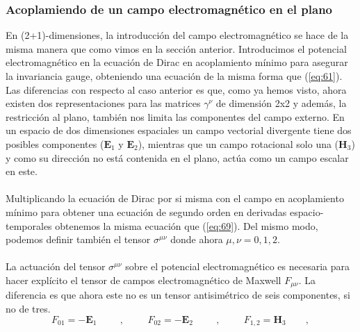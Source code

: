 \documentclass[11pt,letterpaper]{article}     %
\begin{document}
\subsubsection{Acoplamiendo de un campo electromagnético en el plano}







En (2+1)-dimensiones, la introducción del campo electromagnético se hace de la misma manera que como vimos en la sección anterior. Introducimos el potencial electromagnético en la ecuación de Dirac en acoplamiento mínimo para asegurar la invariancia gauge, obteniendo una ecuación de la misma forma que (\ref{eq:61}). Las diferencias con respecto al caso anterior es que, como ya hemos visto, ahora existen dos representaciones para las matrices $\gamma^\nu$ de dimensión 2x2 y además, la restricción al plano, también nos limita las componentes del campo externo. En un espacio de dos dimensiones espaciales un campo vectorial divergente tiene dos posibles componentes ($\textbf{E}_1$ y $\textbf{E}_2$), mientras que un campo rotacional solo una ($\textbf{H}_3$) y como su dirección no está contenida en el plano, actúa como un campo escalar en este. \\ \\
Multiplicando la ecuación de Dirac por si misma con el campo en acoplamiento mínimo para obtener una ecuación de segundo orden en derivadas espacio-temporales obtenemos la misma ecuación que (\ref{eq:69}). Del mismo modo, podemos definir también el tensor $\sigma^{\mu \nu}$ donde ahora $\mu, \nu=0,1,2$. \\ \\
La actuación del tensor $\sigma^{\mu \nu}$ sobre el potencial electromagnético es necesaria para hacer explícito el tensor de campos electromagnético de Maxwell $F_{\mu \nu}$. La diferencia es que ahora este no es un tensor antisimétrico de seis componentes, si no de tres.
\begin{equation}\label{eq:131}
F_{01}=-{\textbf{E}}_1 \hspace{1cm} , \hspace{1cm} F_{02}=- {\textbf{E}}_2 \hspace{1cm} , \hspace{1cm} F_{1,2}={\textbf{H}}_3 \qquad ,
\end{equation} \\ \\
\end{document}
